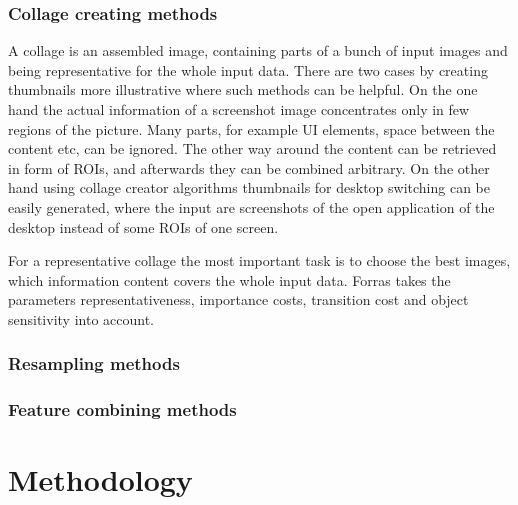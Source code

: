 \documentclass[draft,final]{vutinfth} %
\begin{document}
\subsection{Collage creating methods} 
A collage is an assembled image, containing parts of a bunch of input images and being representative for the whole input data.
There are two cases by creating thumbnails more illustrative where such methods can be helpful.
On the one hand the actual information of a screenshot image concentrates only in few regions of the picture.
Many parts, for example UI elements, space between the content etc, can be ignored. 
The other way around the content can be retrieved in form of ROIs, and afterwards they can be combined arbitrary.
On the other hand using collage creator algorithms thumbnails for desktop switching can be easily generated, where the input are screenshots of the open application of the desktop instead of some ROIs of one screen.\par
For a representative collage the most important task is to choose the best images, which information content covers the whole input data.
Forras takes the parameters representativeness, importance costs, transition cost and object sensitivity into account.

\subsection{Resampling methods}

\subsection{Feature combining methods}

\chapter{Methodology}




\backmatter

\listoffigures %

\cleardoublepage %
\listoftables %

\listofalgorithms
{}

\printindex

\printglossaries



\end{document}
